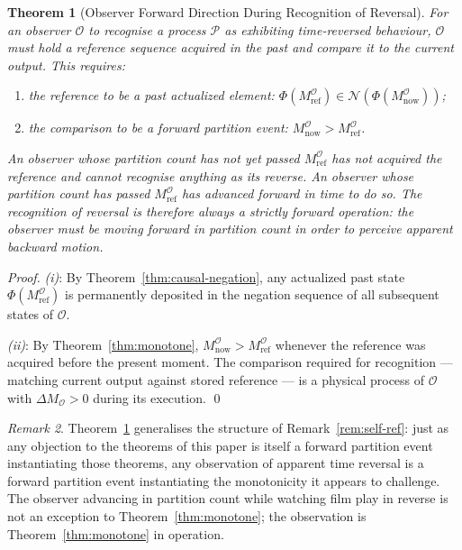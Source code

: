\documentclass[twocolumn,10pt,a4paper]{article}
\theoremstyle{thmstyle}
\newtheorem{theorem}{Theorem}[section]
\theoremstyle{definition}
\theoremstyle{remark}
\newtheorem{remark}[theorem]{Remark}
\newcommand{\PhiMap}{\varPhi}
\begin{document}
\begin{theorem}[Observer Forward Direction During Recognition of Reversal]
\label{thm:obs-recognition}
For an observer $\mathcal{O}$ to recognise a process $\mathcal{P}$ as exhibiting time-reversed behaviour, $\mathcal{O}$ must hold a reference sequence acquired in the past and compare it to the current output. This requires:
\begin{enumerate}[leftmargin=1.5em,label=(\roman*),itemsep=0.1em]
\item the reference to be a past actualized element: $\PhiMap(M_{\mathrm{ref}}^{\mathcal{O}}) \in \mathcal{N}(\PhiMap(M_{\mathrm{now}}^{\mathcal{O}}))$;
\item the comparison to be a forward partition event: $M_{\mathrm{now}}^{\mathcal{O}} > M_{\mathrm{ref}}^{\mathcal{O}}$.
\end{enumerate}
An observer whose partition count has not yet passed $M_{\mathrm{ref}}^{\mathcal{O}}$ has not acquired the reference and cannot recognise anything as its reverse. An observer whose partition count has passed $M_{\mathrm{ref}}^{\mathcal{O}}$ has advanced forward in time to do so. The recognition of reversal is therefore always a strictly forward operation: the observer must be moving forward in partition count in order to perceive apparent backward motion.
\end{theorem}

\begin{proof}
\textit{(i)}: By Theorem~\ref{thm:causal-negation}, any actualized past state $\PhiMap(M_{\mathrm{ref}}^{\mathcal{O}})$ is permanently deposited in the negation sequence of all subsequent states of $\mathcal{O}$.

\textit{(ii)}: By Theorem~\ref{thm:monotone}, $M_{\mathrm{now}}^{\mathcal{O}} > M_{\mathrm{ref}}^{\mathcal{O}}$ whenever the reference was acquired before the present moment. The comparison required for recognition --- matching current output against stored reference --- is a physical process of $\mathcal{O}$ with $\Delta M_{\mathcal{O}} > 0$ during its execution. \qed
\end{proof}

\begin{remark}
Theorem~\ref{thm:obs-recognition} generalises the structure of Remark~\ref{rem:self-ref}: just as any objection to the theorems of this paper is itself a forward partition event instantiating those theorems, any observation of apparent time reversal is a forward partition event instantiating the monotonicity it appears to challenge. The observer advancing in partition count while watching film play in reverse is not an exception to Theorem~\ref{thm:monotone}; the observation is Theorem~\ref{thm:monotone} in operation.
\end{remark}
\end{document}
